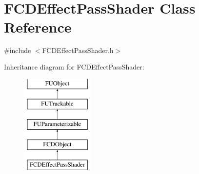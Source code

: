 \hypertarget{classFCDEffectPassShader}{
\section{FCDEffectPassShader Class Reference}
\label{classFCDEffectPassShader}
}


{\ttfamily \#include $<$FCDEffectPassShader.h$>$}

Inheritance diagram for FCDEffectPassShader:\begin{figure}[H]
\begin{center}
\leavevmode
\includegraphics[height=5.000000cm]{classFCDEffectPassShader}
\end{center}
\end{figure}
